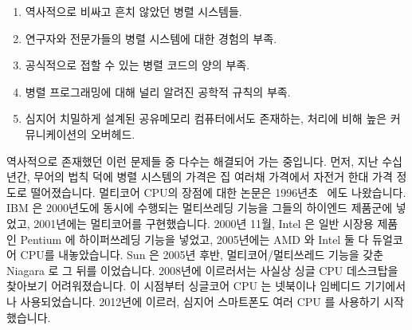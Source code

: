 \begin{enumerate}
\item	역사적으로 비싸고 흔치 않았던 병렬 시스템들.
\item	연구자와 전문가들의 병렬 시스템에 대한 경험의 부족.
\item	공식적으로 접할 수 있는 병렬 코드의 양의 부족.
\item	병렬 프로그래밍에 대해 널리 알려진 공학적 규칙의 부족.
\item	심지어 치밀하게 설계된 공유메모리 컴퓨터에서도 존재하는, 처리에 비해
	높은 커뮤니케이션의 오버헤드.
\end{enumerate}

역사적으로 존재했던 이런 문제들 중 다수는 해결되어 가는 중입니다.
먼저, 지난 수십년간, 무어의 법칙 덕에 병렬 시스템의 가격은 집 여러채 가격에서
자전거 한대 가격 정도로 떨어졌습니다.
멀티코어 CPU의 장점에 대한 논문은 1996년초~\cite{Olukotun96} 에도 나왔습니다.
IBM 은 2000년도에 동시에 수행되는 멀티쓰레딩 기능을 그들의 하이엔드 \Power{}
제품군에 넣었고, 2001년에는 멀티코어를 구현했습니다.
2000년 11월, Intel 은 일반 시장용 제품인 Pentium 에 하이퍼쓰레딩 기능을 넣었고,
2005년에는 AMD 와 Intel 둘 다 듀얼코어 CPU를 내놓았습니다.
Sun 은 2005년 후반, 멀티코어/멀티쓰레드 기능을 갖춘 Niagara 로 그 뒤를
이었습니다.
2008년에 이르러서는 사실상 싱글 CPU 데스크탑을 찾아보기 어려워졌습니다.
이 시점부터 싱글코어 CPU 는 넷북이나 임베디드 기기에서나 사용되었습니다.
2012년에 이르러, 심지어 스마트폰도 여러 CPU 를 사용하기 시작했습니다.

